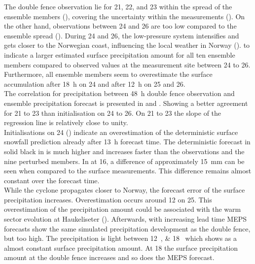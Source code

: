 The double fence observation lie for \num{21}, \num{22}, and \SI{23}{\dec} within the spread of the ensemble members (), covering the uncertainty within the measurements (). On the other hand, observations between \num{24} and \SI{26}{\dec} are too low  compared to the ensemble spread ().
During \num{24} and \SI{26}{\dec}, the low-pressure system intensifies and gets closer to the Norwegian coast, influencing the local weather in Norway ().  to  indicate a larger estimated surface precipitation amount for all ten ensemble members compared to observed values at the measurement site between \num{24} to \SI{26}{\dec}. Furthermore, all ensemble members seem to overestimate the surface accumulation after \SI{18}{\hour} on \SI{24}{\dec} and after \SI{12}{\hour} on \num{25} and \SI{26}{\dec}. 
\\
The correlation for precipitation between \SI{48}{\hour} double fence observation and ensemble precipitation forecast is presented in  and . Showing a better agreement for \num{21} to \SI{23}{\dec} than initialisation on \num{24} to \SI{26}{\dec}. On \num{21} to \SI{23}{\dec} the slope of the regression line is relatively close to unity. 
\\
Initialisations on \SI{24}{\dec} () indicate an overestimation of the deterministic surface snowfall prediction already after \SI{13}{\hour} forecast time. The deterministic forecast in solid black in  is much higher and increases faster than the observations and the nine perturbed members. In  at \SI{16}{\UTC}, a difference of approximately \SI{15}{\mm} can be seen when compared to the surface measurements. This difference remains almost constant over the forecast time. 
\\
While the cyclone propagates closer to Norway, the forecast error of the surface precipitation increases. Overestimation occurs around \SI{12}{\UTC} on \SI{25}{\dec}. This overestimation of the precipitation amount could be associated with the warm sector evolution at Haukeliseter (). Afterwards, with increasing lead time MEPS forecasts show the same simulated precipitation development as the double fence, but too high. The precipitation is light between \SIlist{12;18}{\UTC} which shows as a almost constant surface precipitation amount. At \SI{18}{\UTC} the surface precipitation amount at the double fence increases and so does the MEPS forecast.
